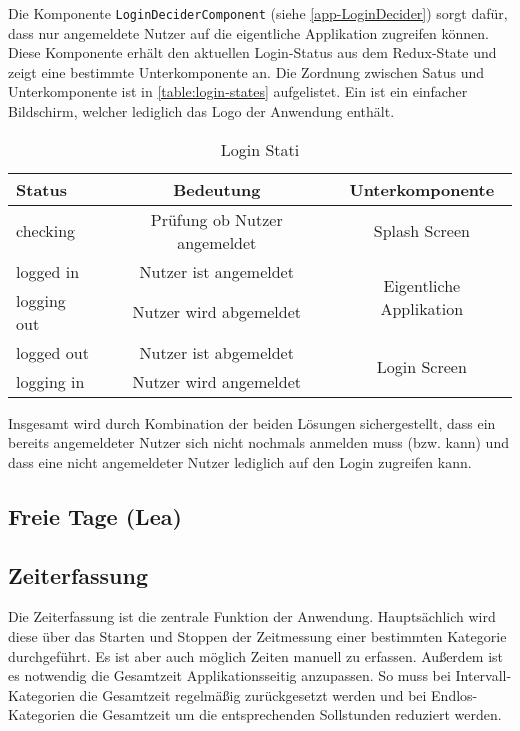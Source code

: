 

Die Komponente \texttt{LoginDeciderComponent} (siehe \autoref{app-LoginDecider}) sorgt dafür,
dass nur angemeldete Nutzer auf die eigentliche Applikation zugreifen können.
Diese Komponente erhält den aktuellen Login-Status aus dem Redux-State und zeigt eine bestimmte Unterkomponente an.
Die Zordnung zwischen Satus und Unterkomponente ist in \autoref{table:login-states} aufgelistet.
Ein  ist ein einfacher Bildschirm, welcher lediglich das Logo der Anwendung enthält.

\begin{table}[h!]
    \centering
     \begin{tabular}{| l | c | c |}
        \hline
        Status      & Bedeutung                      & Unterkomponente \\
        \hline\hline
        checking    & Prüfung ob Nutzer angemeldet   & Splash Screen\\
        \hline
        logged in   & Nutzer ist angemeldet          & \multirow{2}{*}{Eigentliche Applikation}\\
        \cline{1-2}
        logging out & Nutzer wird abgemeldet         & \\
        \hline
        logged out  & Nutzer ist abgemeldet          & \multirow{2}{*}{Login Screen} \\
        \cline{1-2}
        logging in  & Nutzer wird angemeldet         & \\
        \hline
     \end{tabular}
     \caption{Login Stati}
     \label{table:login-states}
\end{table}

Insgesamt wird durch Kombination der beiden Lösungen sichergestellt,
dass ein bereits angemeldeter Nutzer sich nicht nochmals anmelden muss (bzw. kann)
und dass eine nicht angemeldeter Nutzer lediglich auf den Login zugreifen kann.

\subsection{Freie Tage (Lea)}

\subsection{Zeiterfassung}
Die Zeiterfassung ist die zentrale Funktion der Anwendung.
Hauptsächlich wird diese über das Starten und Stoppen der Zeitmessung einer bestimmten Kategorie durchgeführt.
Es ist aber auch möglich Zeiten manuell zu erfassen.
Außerdem ist es notwendig die Gesamtzeit Applikationsseitig anzupassen.
So muss bei Intervall-Kategorien die Gesamtzeit regelmäßig zurückgesetzt werden
und bei Endlos-Kategorien die Gesamtzeit um die entsprechenden Sollstunden reduziert werden.

